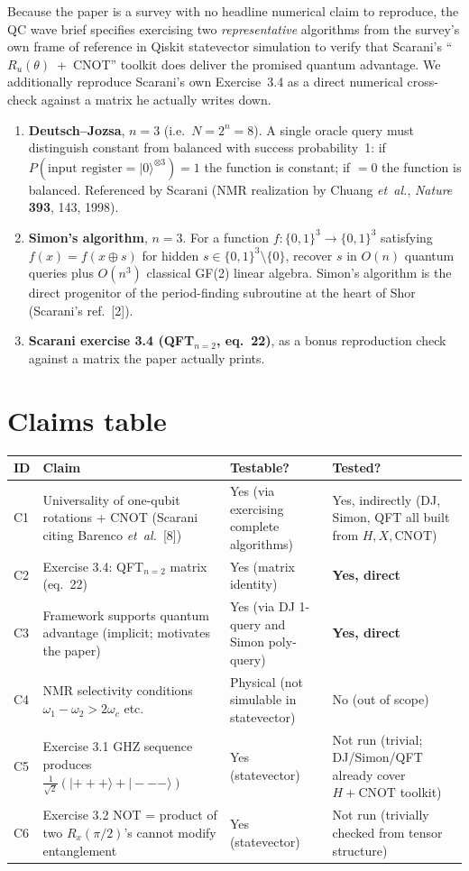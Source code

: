 \documentclass[11pt]{article}
\begin{document}
Because the paper is a survey with no headline numerical claim to reproduce, the QC wave brief specifies exercising two \emph{representative} algorithms from the survey's own frame of reference in Qiskit statevector simulation to verify that Scarani's ``$R_u(\theta)$~+~CNOT'' toolkit does deliver the promised quantum advantage.  We additionally reproduce Scarani's own Exercise~3.4 as a direct numerical cross-check against a matrix he actually writes down.

\begin{enumerate}
    \item \textbf{Deutsch--Jozsa}, $n=3$ (i.e.\ $N=2^n=8$).  A single oracle query must distinguish constant from balanced with success probability~1: if $P(\text{input register} = |0\rangle^{\otimes 3}) = 1$ the function is constant; if $= 0$ the function is balanced.  Referenced by Scarani (NMR realization by Chuang \emph{et~al.}, \emph{Nature} \textbf{393}, 143, 1998).
    \item \textbf{Simon's algorithm}, $n=3$.  For a function $f:\{0,1\}^3\to\{0,1\}^3$ satisfying $f(x)=f(x\oplus s)$ for hidden $s\in\{0,1\}^3\setminus\{0\}$, recover $s$ in $O(n)$ quantum queries plus $O(n^3)$ classical GF(2) linear algebra.  Simon's algorithm is the direct progenitor of the period-finding subroutine at the heart of Shor (Scarani's ref.~[2]).
    \item \textbf{Scarani exercise 3.4 (QFT$_{n=2}$, eq.~22)}, as a bonus reproduction check against a matrix the paper actually prints.
\end{enumerate}

\section{Claims table}

\begin{tabular}{lp{6.5cm}ll}
\toprule
ID & Claim & Testable? & Tested?\\
\midrule
C1 & Universality of one-qubit rotations + CNOT (Scarani citing Barenco \emph{et~al.}~[8]) & Yes (via exercising complete algorithms) & Yes, indirectly (DJ, Simon, QFT all built from $H,X,\text{CNOT}$) \\
C2 & Exercise 3.4: QFT$_{n=2}$ matrix (eq.~22) & Yes (matrix identity) & \textbf{Yes, direct} \\
C3 & Framework supports quantum advantage (implicit; motivates the paper) & Yes (via DJ 1-query and Simon poly-query) & \textbf{Yes, direct} \\
C4 & NMR selectivity conditions $\omega_1{-}\omega_2 > 2\omega_c$ etc. & Physical (not simulable in statevector) & No (out of scope) \\
C5 & Exercise 3.1 GHZ sequence produces $\tfrac{1}{\sqrt 2}(|{+}{+}{+}\rangle+|{-}{-}{-}\rangle)$ & Yes (statevector) & Not run (trivial; DJ/Simon/QFT already cover $H+\text{CNOT}$ toolkit) \\
C6 & Exercise 3.2 NOT = product of two $R_x(\pi/2)$'s cannot modify entanglement & Yes (statevector) & Not run (trivially checked from tensor structure) \\
\bottomrule
\end{tabular}
\end{document}
